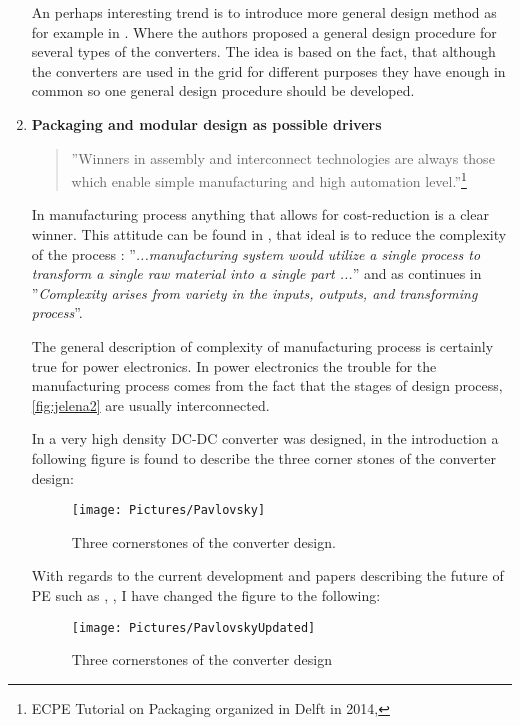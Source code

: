 \documentclass[]{scrartcl}
\begin{document}
\begin{enumerate}
	An perhaps interesting trend is to introduce more general design method as for example in \cite{Ortjohann2009}. Where the authors proposed a general design procedure for several types of the converters. The idea is based on the fact, that although the converters are used in the grid for different purposes they have enough in common so one general design procedure should be developed. 
	
	\item 	\textbf{Packaging and modular design as possible drivers}
	
	 \begin{quote}
		''Winners in assembly and interconnect technologies are always those which enable simple manufacturing and high automation level.''\footnote{ ECPE Tutorial on Packaging organized in Delft in 2014,\cite{Bayerer}}
	\end{quote}
	
In manufacturing process anything that allows for cost-reduction is a clear winner. This attitude can be found in \cite{Ulrich2004}, that ideal is to reduce the complexity of the process  : ''\emph{...manufacturing system would utilize a single process to transform a single raw material into a single part ...}'' and as continues in \cite{Ulrich2004} ''\emph{Complexity arises from variety in the inputs, outputs, and transforming process}''.

The general description of complexity of manufacturing process is certainly true for power electronics. In power electronics the trouble for the manufacturing process comes from the fact that the stages of design process, \ref{fig:jelena2} are usually interconnected. 
	
	In \cite{Pavlovsky2006} a very high density DC-DC converter was designed, in the introduction a following figure is found to describe the three corner stones of the converter design:
	\begin{figure}[h!]
		\centering
		\texttt{[image: Pictures/Pavlovsky]}
		\caption{Three cornerstones of the converter design. \cite{Pavlovsky2006}}
		\label{fig:pavlovsky}
	\end{figure}
	
	With regards to the current development and papers describing the future of PE such as \cite{VanWyk2013}, \cite{Kolar2014a},\cite{Boroyevich2015} I have changed the figure to the following: 
	
	\begin{figure}[h!]
		\centering
		\texttt{[image: Pictures/PavlovskyUpdated]}
		\caption{Three cornerstones of the converter design}
		\label{fig:pavlovskyupdated}
	\end{figure}
	

\end{enumerate}
\end{document}
